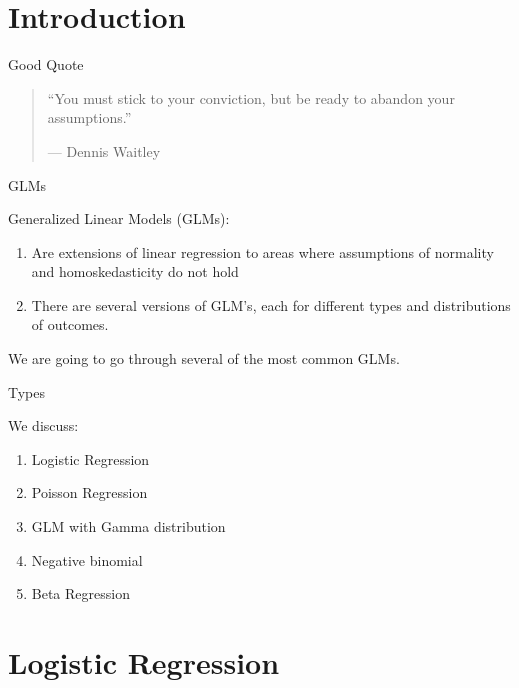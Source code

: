 \section{Introduction}\label{introduction}

\begin{frame}{Good Quote}

\Large

\begin{quote}
``You must stick to your conviction, but be ready to abandon your
assumptions.''

--- Dennis Waitley
\end{quote}

\end{frame}

\begin{frame}{GLMs}

\large
Generalized Linear Models (GLMs):

\begin{enumerate}
\def\labelenumi{\arabic{enumi}.}
\tightlist
\item
  Are extensions of linear regression to areas where assumptions of
  normality and homoskedasticity do not hold
\item
  There are several versions of GLM's, each for different types and
  distributions of outcomes.
\end{enumerate}

We are going to go through several of the most common GLMs.

\end{frame}

\begin{frame}{Types}

\large 

We discuss:

\begin{enumerate}
\def\labelenumi{\arabic{enumi}.}
\tightlist
\item
  Logistic Regression
\item
  Poisson Regression
\item
  GLM with Gamma distribution
\item
  Negative binomial
\item
  Beta Regression
\end{enumerate}

\end{frame}

\section{Logistic Regression}\label{logistic-regression}

